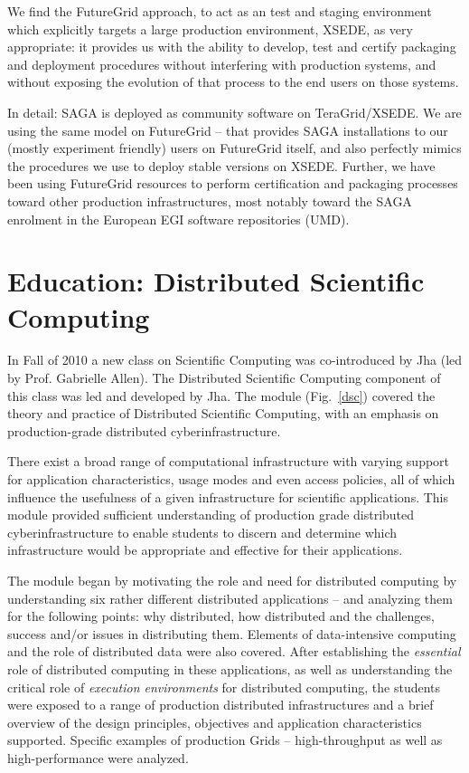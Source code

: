 \documentclass[]{paper}
\begin{document}
 We find the FutureGrid approach, to act as an test and staging
 environment which explicitly targets a large production environment,
 XSEDE, as very appropriate: it provides us with the ability to
 develop, test and certify packaging and deployment procedures without
 interfering with production systems, and without exposing the
 evolution of that process to the end users on those systems.  

 In detail: SAGA is deployed as community software on TeraGrid/XSEDE.
 We are using the same model on FutureGrid -- that provides SAGA
 installations to our (mostly experiment friendly) users on FutureGrid
 itself, and also perfectly mimics the procedures we use to deploy
 stable versions on XSEDE.  Further, we have been using FutureGrid
 resources to perform certification and packaging processes toward
 other production infrastructures, most notably toward the SAGA
 enrolment in the European EGI software repositories (UMD).


\section{Education: Distributed Scientific Computing}
\label{sec:edu}

In Fall of 2010 a new class on Scientific Computing was co-introduced
by Jha (led by Prof. Gabrielle Allen). The Distributed Scientific
Computing component of this class was led and developed by Jha.  The
module (Fig.~\ref{dsc}) covered the theory and practice of Distributed
Scientific Computing, with an emphasis on production-grade distributed
cyberinfrastructure.

There exist a broad range of computational infrastructure with varying
support for application characteristics, usage modes and even access
policies, all of which influence the usefulness of a given
infrastructure for scientific applications.  This module provided
sufficient understanding of production grade distributed
cyberinfrastructure to enable students to discern and determine which
infrastructure would be appropriate and effective for their
applications.

The module began by motivating the role and need for distributed
computing by understanding six rather different distributed
applications -- and analyzing them for the following points: why
distributed, how distributed and the challenges, success and/or issues
in distributing them. Elements of data-intensive computing and the
role of distributed data were also covered.  After establishing the
{\it essential} role of distributed computing in these applications,
as well as understanding the critical role of {\it execution
  environments} for distributed computing, the students were exposed
to a range of production distributed infrastructures and a brief
overview of the design principles, objectives and application
characteristics supported.  Specific examples of production Grids --
high-throughput as well as high-performance were analyzed.
\end{document}
